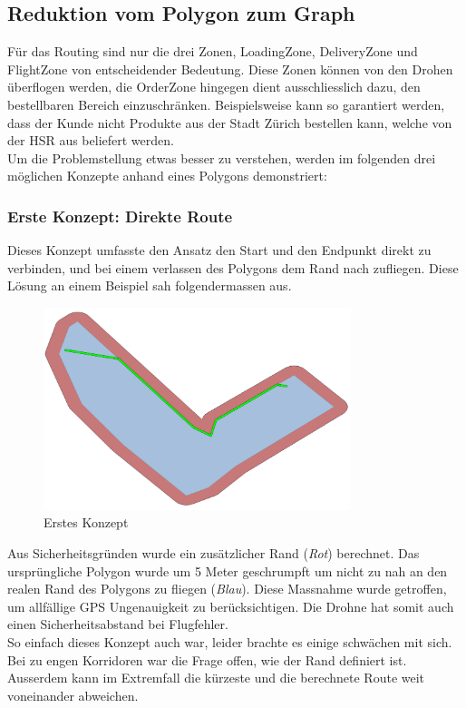 \subsection{Reduktion vom Polygon zum Graph}
Für das Routing sind nur die drei Zonen, LoadingZone, DeliveryZone und FlightZone von entscheidender Bedeutung. Diese Zonen können von den Drohen überflogen werden, die OrderZone hingegen dient ausschliesslich dazu, den bestellbaren Bereich einzuschränken. Beispielsweise kann so garantiert werden, dass der Kunde nicht Produkte aus der Stadt Zürich bestellen kann, welche von der HSR aus beliefert werden.
\\
Um die Problemstellung etwas besser zu verstehen, werden im folgenden drei möglichen Konzepte anhand eines Polygons demonstriert:
\subsubsection{Erste Konzept: Direkte Route}
Dieses Konzept umfasste den Ansatz den Start und den Endpunkt direkt zu verbinden, und bei einem verlassen des Polygons dem Rand nach zufliegen. Diese Lösung an einem Beispiel sah folgendermassen aus.
\begin{figure}[H]
	\centering
	\includegraphics[width=0.8\textwidth]{images/routing/firstSolution.png}
	\caption{Erstes Konzept}
	\label{fig:first-concet-routing}
\end{figure}
Aus Sicherheitsgründen wurde ein zusätzlicher Rand (\textit{Rot}) berechnet. Das ursprüngliche Polygon wurde um 5 Meter geschrumpft um nicht zu nah an den realen Rand des Polygons zu fliegen (\textit{Blau}). Diese Massnahme wurde getroffen, um allfällige GPS Ungenauigkeit zu berücksichtigen. Die Drohne hat somit auch einen Sicherheitsabstand bei Flugfehler.
\\
So einfach dieses Konzept auch war, leider brachte es einige schwächen mit sich. Bei zu engen Korridoren war die Frage offen, wie der Rand definiert ist. Ausserdem kann im Extremfall die kürzeste und die berechnete Route weit voneinander abweichen.
\newpage
